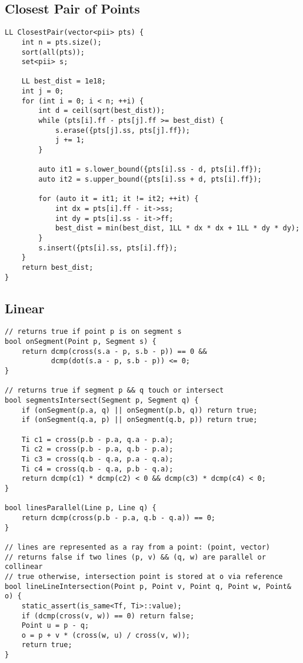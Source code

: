 \documentclass[10pt,a4paper,onesided]{article}
\begin{document}
\begin{multicols*}{3}
\subsection{Closest Pair of Points}
\begin{lstlisting}
LL ClosestPair(vector<pii> pts) {
    int n = pts.size();
    sort(all(pts));
    set<pii> s;

    LL best_dist = 1e18;
    int j = 0;
    for (int i = 0; i < n; ++i) {
        int d = ceil(sqrt(best_dist));
        while (pts[i].ff - pts[j].ff >= best_dist) {
            s.erase({pts[j].ss, pts[j].ff});
            j += 1;
        }

        auto it1 = s.lower_bound({pts[i].ss - d, pts[i].ff});
        auto it2 = s.upper_bound({pts[i].ss + d, pts[i].ff});

        for (auto it = it1; it != it2; ++it) {
            int dx = pts[i].ff - it->ss;
            int dy = pts[i].ss - it->ff;
            best_dist = min(best_dist, 1LL * dx * dx + 1LL * dy * dy);
        }
        s.insert({pts[i].ss, pts[i].ff});
    }
    return best_dist;
}
\end{lstlisting}
\subsection{Linear}
\begin{lstlisting}
// returns true if point p is on segment s
bool onSegment(Point p, Segment s) {
    return dcmp(cross(s.a - p, s.b - p)) == 0 &&
           dcmp(dot(s.a - p, s.b - p)) <= 0;
}

// returns true if segment p && q touch or intersect
bool segmentsIntersect(Segment p, Segment q) {
    if (onSegment(p.a, q) || onSegment(p.b, q)) return true;
    if (onSegment(q.a, p) || onSegment(q.b, p)) return true;

    Ti c1 = cross(p.b - p.a, q.a - p.a);
    Ti c2 = cross(p.b - p.a, q.b - p.a);
    Ti c3 = cross(q.b - q.a, p.a - q.a);
    Ti c4 = cross(q.b - q.a, p.b - q.a);
    return dcmp(c1) * dcmp(c2) < 0 && dcmp(c3) * dcmp(c4) < 0;
}

bool linesParallel(Line p, Line q) {
    return dcmp(cross(p.b - p.a, q.b - q.a)) == 0;
}

// lines are represented as a ray from a point: (point, vector)
// returns false if two lines (p, v) && (q, w) are parallel or collinear
// true otherwise, intersection point is stored at o via reference
bool lineLineIntersection(Point p, Point v, Point q, Point w, Point& o) {
    static_assert(is_same<Tf, Ti>::value);
    if (dcmp(cross(v, w)) == 0) return false;
    Point u = p - q;
    o = p + v * (cross(w, u) / cross(v, w));
    return true;
}


\end{lstlisting}
\end{multicols*}
\end{document}
